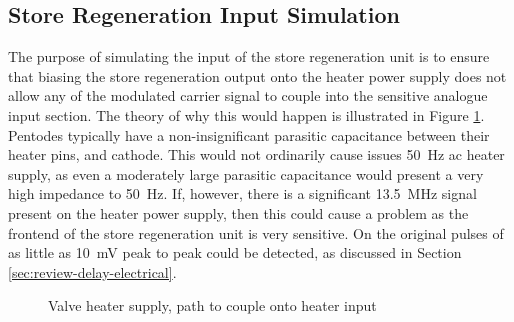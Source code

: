 \subsection{Store Regeneration Input Simulation}
The purpose of simulating the input of the store regeneration unit is to ensure that biasing the store regeneration output onto the heater power supply does not allow any of the modulated carrier signal to couple into the sensitive analogue input section. The theory of why this would happen is illustrated in Figure \ref{fig:store-regen-input-sch}. Pentodes typically have a non-insignificant parasitic capacitance between their heater pins, and cathode. This would not ordinarily cause issues \SI{50}{\hertz} \gls{ac} heater supply, as even a moderately large parasitic capacitance would present a very high impedance to \SI{50}{\hertz}. If, however, there is a significant \SI{13.5}{\mega\hertz} signal present on the heater power supply, then this could cause a problem as the frontend of the store regeneration unit is very sensitive. On the original pulses of as little as \SI{10}{\milli\volt} peak to peak could be detected, as discussed in Section \ref{sec:review-delay-electrical}.

\begin{figure}[ht]
	\centering
	\caption{Valve heater supply, path to couple onto heater input}
	\label{fig:store-regen-input-sch}
\end{figure}

